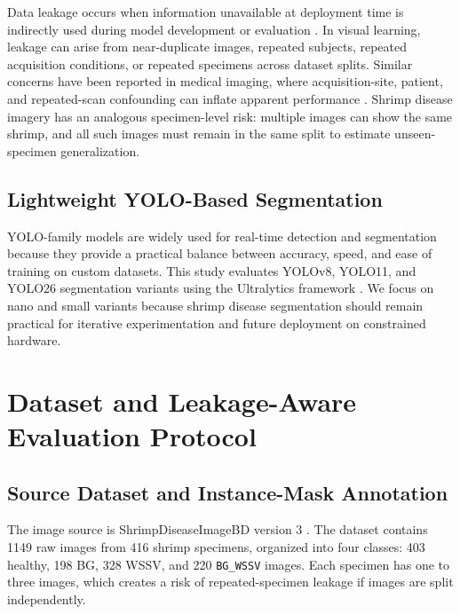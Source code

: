 \documentclass{svproc}
\begin{document}
Data leakage occurs when information unavailable at deployment time is indirectly used during model development or evaluation \cite{kaufman2012leakage}. In visual learning, leakage can arise from near-duplicate images, repeated subjects, repeated acquisition conditions, or repeated specimens across dataset splits. Similar concerns have been reported in medical imaging, where acquisition-site, patient, and repeated-scan confounding can inflate apparent performance \cite{zech2018confounding,roberts2021common,tampu2022inflation}. Shrimp disease imagery has an analogous specimen-level risk: multiple images can show the same shrimp, and all such images must remain in the same split to estimate unseen-specimen generalization.

\subsection{Lightweight YOLO-Based Segmentation}

YOLO-family models are widely used for real-time detection and segmentation because they provide a practical balance between accuracy, speed, and ease of training on custom datasets. This study evaluates YOLOv8, YOLO11, and YOLO26 segmentation variants using the Ultralytics framework \cite{ultralytics2026}. We focus on nano and small variants because shrimp disease segmentation should remain practical for iterative experimentation and future deployment on constrained hardware.

\section{Dataset and Leakage-Aware Evaluation Protocol}

\subsection{Source Dataset and Instance-Mask Annotation}

The image source is ShrimpDiseaseImageBD version 3 \cite{islam2025shrimpdiseaseimagebd}. The dataset contains 1149 raw images from 416 shrimp specimens, organized into four classes: 403 healthy, 198 BG, 328 WSSV, and 220 \texttt{BG\_WSSV} images. Each specimen has one to three images, which creates a risk of repeated-specimen leakage if images are split independently.
\end{document}
